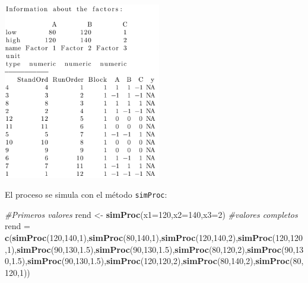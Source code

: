 \documentclass[
]{book}
\newenvironment{Shaded}{\begin{snugshade}}{\end{snugshade}}
\newcommand{\AttributeTok}[1]{\textcolor[rgb]{0.13,0.29,0.53}{#1}}
\newcommand{\CommentTok}[1]{\textcolor[rgb]{0.56,0.35,0.01}{\textit{#1}}}
\newcommand{\DecValTok}[1]{\textcolor[rgb]{0.00,0.00,0.81}{#1}}
\newcommand{\FloatTok}[1]{\textcolor[rgb]{0.00,0.00,0.81}{#1}}
\newcommand{\FunctionTok}[1]{\textcolor[rgb]{0.13,0.29,0.53}{\textbf{#1}}}
\newcommand{\NormalTok}[1]{#1}
\newcommand{\OtherTok}[1]{\textcolor[rgb]{0.56,0.35,0.01}{#1}}
\begin{document}
\includegraphics[width=2.70833in,height=\textheight]{graficos/dfac.png}

El proceso se simula con el método \texttt{simProc}:

\begin{Shaded}
\begin{Highlighting}[]
\CommentTok{\#Primeros valores}
\NormalTok{rend }\OtherTok{\textless{}{-}} \FunctionTok{simProc}\NormalTok{(}\AttributeTok{x1=}\DecValTok{120}\NormalTok{,}\AttributeTok{x2=}\DecValTok{140}\NormalTok{,}\AttributeTok{x3=}\DecValTok{2}\NormalTok{)}
\CommentTok{\#valores completos}
\NormalTok{rend }\OtherTok{=} \FunctionTok{c}\NormalTok{(}\FunctionTok{simProc}\NormalTok{(}\DecValTok{120}\NormalTok{,}\DecValTok{140}\NormalTok{,}\DecValTok{1}\NormalTok{),}\FunctionTok{simProc}\NormalTok{(}\DecValTok{80}\NormalTok{,}\DecValTok{140}\NormalTok{,}\DecValTok{1}\NormalTok{),}\FunctionTok{simProc}\NormalTok{(}\DecValTok{120}\NormalTok{,}\DecValTok{140}\NormalTok{,}\DecValTok{2}\NormalTok{),}\FunctionTok{simProc}\NormalTok{(}\DecValTok{120}\NormalTok{,}\DecValTok{120}\NormalTok{,}\DecValTok{1}\NormalTok{),}\FunctionTok{simProc}\NormalTok{(}\DecValTok{90}\NormalTok{,}\DecValTok{130}\NormalTok{,}\FloatTok{1.5}\NormalTok{),}\FunctionTok{simProc}\NormalTok{(}\DecValTok{90}\NormalTok{,}\DecValTok{130}\NormalTok{,}\FloatTok{1.5}\NormalTok{),}\FunctionTok{simProc}\NormalTok{(}\DecValTok{80}\NormalTok{,}\DecValTok{120}\NormalTok{,}\DecValTok{2}\NormalTok{),}\FunctionTok{simProc}\NormalTok{(}\DecValTok{90}\NormalTok{,}\DecValTok{130}\NormalTok{,}\FloatTok{1.5}\NormalTok{),}\FunctionTok{simProc}\NormalTok{(}\DecValTok{90}\NormalTok{,}\DecValTok{130}\NormalTok{,}\FloatTok{1.5}\NormalTok{),}\FunctionTok{simProc}\NormalTok{(}\DecValTok{120}\NormalTok{,}\DecValTok{120}\NormalTok{,}\DecValTok{2}\NormalTok{),}\FunctionTok{simProc}\NormalTok{(}\DecValTok{80}\NormalTok{,}\DecValTok{140}\NormalTok{,}\DecValTok{2}\NormalTok{),}\FunctionTok{simProc}\NormalTok{(}\DecValTok{80}\NormalTok{,}\DecValTok{120}\NormalTok{,}\DecValTok{1}\NormalTok{))}
\end{Highlighting}
\end{Shaded}
\end{document}
